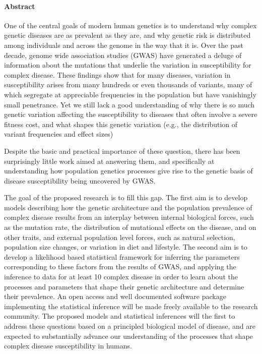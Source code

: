 \documentclass[11pt]{article}
\begin{document}
\paragraph{Abstract}






One of the central goals of modern human genetics is to understand why complex genetic diseases are as prevalent as they are, and why genetic risk is distributed among individuals and across the genome in the way that it is. Over the past decade, genome wide association studies (GWAS) have generated a deluge of information about the mutations that underlie the variation in susceptibility for complex disease. These findings show that for many diseases, variation in susceptibility arises from many hundreds or even thousands of variants, many of which segregate at appreciable frequencies in the population but have vanishingly small penetrance. Yet we still lack a good understanding of why there is so much genetic variation affecting the susceptibility to diseases that often involve a severe fitness cost, and what shapes this genetic variation (e.g., the distribution of variant frequencies and effect sizes)


Despite the basic and practical importance of these question, there has been surprisingly little work aimed at answering them, and specifically at understanding how population genetics processes give rise to the genetic basis of disease susceptibility being uncovered by GWAS.

The goal of the proposed research is to fill this gap. The first aim is to develop models describing how the genetic architecture and the population prevalence of complex disease results from an interplay between internal biological forces, such as the mutation rate, the distribution of mutational effects on the disease, and on other traits, and external population level forces, such as natural selection, population size changes, or variation in diet and lifestyle. The second aim is to develop a likelihood based statistical framework for inferring the parameters corresponding to these factors from the results of GWAS, and applying the inference to data for at least 10 complex disease in order to learn about the processes and parameters that shape their genetic architecture and determine their prevalence. An open access and well documented software package implementing the statistical inference will be made freely available to the research community. The proposed models and statistical inferences will the first to address these questions based on a principled biological model of disease, and are expected to substantially advance our understanding of the processes that shape complex disease susceptibility in humans. 
\end{document}
